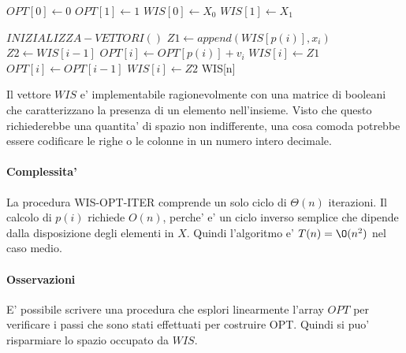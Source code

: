 \begin{algorithm}
    \begin{algorithmic}
            \State $OPT[0] \gets 0$
            \State $OPT[1] \gets 1$
            \State $WIS[0] \gets X_0$
            \State $WIS[1] \gets X_1$
        \EndProcedure
    \end{algorithmic}
\end{algorithm}

\begin{algorithm}
    \begin{algorithmic}
            \State $INIZIALIZZA-VETTORI()$
                \State $Z1 \gets append(WIS[p(i)], x_i)$
                \State $Z2 \gets WIS[i-1]$
                    \State $OPT[i] \gets OPT[p(i)] + v_i$
                    \State $WIS[i] \gets Z1$
                \Else
                    \State $OPT[i] \gets OPT[i-1]$
                    \State $WIS[i] \gets Z2$
                \EndIf
            \EndFor
            \State \Return WIS[n]
        \EndProcedure
    \end{algorithmic}
\end{algorithm}

Il vettore $WIS$ e' implementabile ragionevolmente con una matrice di booleani che caratterizzano la presenza di un elemento nell'insieme. Visto che questo richiederebbe una quantita' di spazio non indifferente, una cosa comoda potrebbe essere codificare le righe o le colonne in un numero intero decimale.

\paragraph{Complessita'}

La procedura WIS-OPT-ITER comprende un solo ciclo di $\Theta(n)$ iterazioni.
Il calcolo di $p(i)$ richiede $O(n)$, perche' e' un ciclo inverso semplice che dipende dalla disposizione degli elementi in $X$.
Quindi l'algoritmo e' $T(n) = \O(n^2)$ nel caso medio.

\paragraph{Osservazioni}

E' possibile scrivere una procedura che esplori linearmente l'array $OPT$ per verificare i passi che sono stati effettuati per costruire OPT. Quindi si puo' risparmiare lo spazio occupato da $WIS$.

